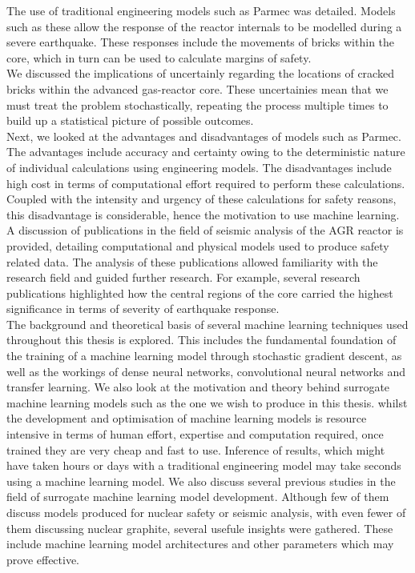  \noindent
 The use of traditional engineering models such as Parmec was detailed. Models such as these allow the response of the reactor internals to be modelled during a severe earthquake. These responses include the movements of bricks within the core, which in turn can be used to calculate margins of safety. \\
 
 \noindent We discussed the implications of uncertainly regarding the locations of cracked bricks within the advanced gas-reactor core. These uncertainies mean that we must treat the problem stochastically, repeating the process multiple times to build up a statistical picture of possible outcomes. \\
 
 \noindent
Next, we looked at the advantages and disadvantages of models such as Parmec. The advantages include accuracy and certainty owing to the deterministic nature of individual calculations using engineering models. The disadvantages include high cost in terms of computational effort required to perform these calculations. Coupled with the intensity and urgency of these calculations for safety reasons, this disadvantage is considerable, hence the motivation to use machine learning. \\

\noindent
A discussion of publications in the field of seismic analysis of the AGR reactor is provided, detailing computational and physical models used to produce safety related data. The analysis of these publications allowed familiarity with the research field and guided further research. For example, several research publications highlighted how the central regions of the core carried the highest significance in terms of severity of earthquake response.\\

\noindent
The background and theoretical basis of several machine learning techniques used throughout this thesis is explored. This includes the fundamental foundation of the training of a machine learning model through stochastic gradient descent, as well as the workings of dense neural networks, convolutional neural networks and transfer learning. We also look at the motivation and theory behind surrogate machine learning models such as the one we wish to produce in this thesis. whilst the development and optimisation of machine learning models is resource intensive in terms of human effort, expertise and computation required, once trained they are very cheap and fast to use. Inference of results, which might have taken hours or days with a traditional engineering model may take seconds using a machine learning model.  We also discuss several previous studies in the field of surrogate machine learning model development. Although few of them discuss models produced for nuclear safety or seismic analysis, with even fewer of them discussing nuclear graphite, several usefule insights were gathered. These include machine learning model architectures and other parameters which may prove effective.\\

